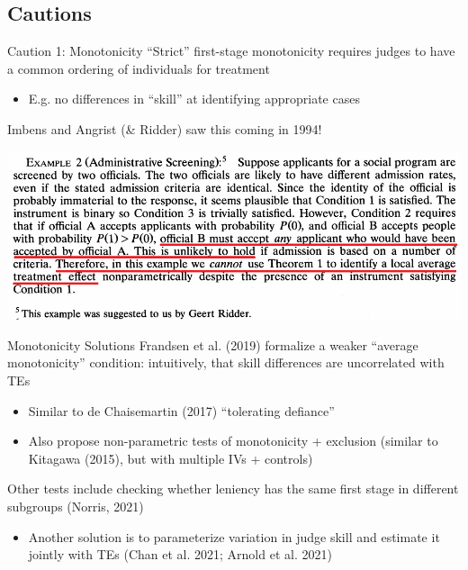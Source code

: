 \documentclass{beamer}
\begin{document}
\subsection{Cautions}
\begin{frame}{Caution 1: Monotonicity}
``Strict'' first-stage monotonicity requires judges to have a common ordering of individuals for treatment\smallskip
\begin{itemize}
\item E.g. no differences in ``skill'' at identifying appropriate cases
\end{itemize}\medskip\pause{}
Imbens and Angrist (\& Ridder) saw this coming in 1994! 
\begin{center}
\includegraphics[scale=0.85]{./lecture_includes/imbens_angrist_judges.png}
\end{center}
\end{frame}

\begin{frame}{Monotonicity Solutions}
Frandsen et al. (2019) formalize a weaker ``average monotonicity'' condition: intuitively, that skill differences are uncorrelated with TEs\smallskip
\begin{itemize}
\item Similar to de Chaisemartin (2017) ``tolerating defiance''\smallskip
\item Also propose non-parametric tests of monotonicity + exclusion (similar to Kitagawa (2015), but with multiple IVs + controls)
\end{itemize}\medskip\pause{}

Other tests include checking whether leniency has the same first stage in different subgroups (Norris, 2021)\smallskip
\begin{itemize}
\item Another solution is to parameterize variation in judge skill and estimate it jointly with TEs (Chan et al. 2021; Arnold et al. 2021)
\end{itemize}

\end{frame}
\end{document}
